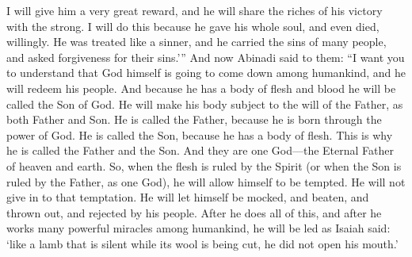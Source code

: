 I will give him a very great reward, and he will share the riches of his victory with the strong. I will do this because he gave his whole soul, and even died, willingly. He was treated like a sinner, and he carried the sins of many people, and asked forgiveness for their sins.\rq ''
\bchapter
\bverse \iffalse And now Abinadi said unto them: I would that ye should understand that God himself shall come down among the children of men, and shall redeem his people. \fi
And now Abinadi said to them: ``I want you to understand that God himself is going to come down among humankind, and he will redeem his people.
\bverse \iffalse And because he dwelleth in flesh he shall be called the Son of God, and having subjected the flesh to the will of the Father, being the Father and the Son-- \fi
And because he has a body of flesh and blood he will be called the Son of God. He will make his body subject to the will of the Father, as both Father and Son.
\bverse \iffalse The Father, because he was conceived by the power of God; and the Son, because of the flesh; thus becoming the Father and Son-- \fi
He is called the Father, because he is born through the power of God. He is called the Son, because he has a body of flesh. This is why he is called the Father and the Son.
\bverse \iffalse And they are one God, yea, the very Eternal Father of heaven and of earth. \fi
And they are one God---the Eternal Father of heaven and earth.
\bverse \iffalse And thus the flesh becoming subject to the Spirit, or the Son to the Father, being one God, suffereth temptation, and yieldeth not to the temptation, but suffereth himself to be mocked, and scourged, and cast out, and disowned by his people. \fi
So, when the flesh is ruled by the Spirit (or when the Son is ruled by the Father, as one God), he will allow himself to be tempted. He will not give in to that temptation. He will let himself be mocked, and beaten, and thrown out, and rejected by his people.
\bverse \iffalse And after all this, after working many mighty miracles among the children of men, he shall be led, yea, even as Isaiah said, as a sheep before the shearer is dumb, so he opened not his mouth. \fi
After he does all of this, and after he works many powerful miracles among humankind, he will be led as Isaiah said: \lq like a lamb that is silent while its wool is being cut, he did not open his mouth.\rq
\bverse \iffalse Yea, even so he shall be led, crucified, and slain, the flesh becoming subject even unto death, the will of the Son being swallowed up in the will of the Father. \fi
